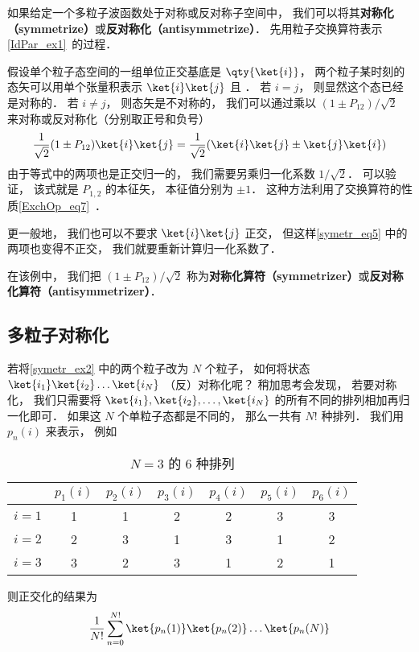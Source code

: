 

如果给定一个多粒子波函数处于对称或反对称子空间中， 我们可以将其\textbf{对称化（symmetrize）}或\textbf{反对称化（antisymmetrize）}． 先用粒子交换算符表示\autoref{IdPar_ex1}~的过程．

\begin{example}{}\label{symetr_ex2}
假设单个粒子态空间的一组单位正交基底是 $\qty{\ket{i}}$， 两个粒子某时刻的态矢可以用单个张量积表示 $\ket{i}\ket{j}$ 且 ． 若 $i = j$， 则显然这个态已经是对称的．  若 $i \ne j$， 则态矢是不对称的， 我们可以通过乘以 $(1 \pm P_{12})/\sqrt{2}$ 来对称或反对称化（分别取正号和负号）
\begin{equation}\label{symetr_eq5}
\frac{1}{\sqrt{2}}(1 \pm P_{12})\ket{i}\ket{j} = \frac{1}{\sqrt{2}}(\ket{i}\ket{j} \pm \ket{j}\ket{i})
\end{equation}
由于等式中的两项也是正交归一的， 我们需要另乘归一化系数 $1/\sqrt 2$． 可以验证， 该式就是 $P_{1,2}$ 的本征矢， 本征值分别为 $\pm 1$． 这种方法利用了交换算符的性质\autoref{ExchOp_eq7}~．

更一般地， 我们也可以不要求 $\ket{i}\ket{j}$ 正交， 但这样\autoref{symetr_eq5} 中的两项也变得不正交， 我们就要重新计算归一化系数了．
\end{example}

在该例中， 我们把 $(1 \pm P_{12})/\sqrt{2}$ 称为\textbf{对称化算符（symmetrizer）}或\textbf{反对称化算符（antisymmetrizer）}．

\subsection{多粒子对称化}
若将\autoref{symetr_ex2} 中的两个粒子改为 $N$ 个粒子， 如何将状态 $\ket{i_1}\ket{i_2}\dots\ket{i_N}$ （反）对称化呢？ 稍加思考会发现， 若要对称化， 我们只需要将 $\ket{i_1},\ket{i_2},\dots,\ket{i_N}$ 的所有不同的排列相加再归一化即可． 如果这 $N$ 个单粒子态都是不同的， 那么一共有 $N!$ 种排列． 我们用 $p_n(i)$ 来表示， 例如
\begin{table}[ht]
\centering
\caption{$N = 3$ 的 6 种排列}\label{symetr_tab2}
\begin{tabular}{|c|c|c|c|c|c|c|}
\hline
  & $p_1(i)$ & $p_2(i)$ & $p_3(i)$ & $p_4(i)$ & $p_5(i)$ & $p_6(i)$ \\
\hline
$i=1$ & 1 & 1 & 2 & 2 & 3 & 3 \\
\hline
$i=2$ & 2 & 3 & 1 & 3 & 1 & 2 \\
\hline
$i=3$ & 3 & 2 & 3 & 1 & 2 & 1 \\
\hline
\end{tabular}
\end{table}
则正交化的结果为
\begin{equation}
\frac{1}{N!}\sum_{n = 0}^{N!} \ket{p_n(1)}\ket{p_n(2)}\dots\ket{p_n(N)}
\end{equation}


